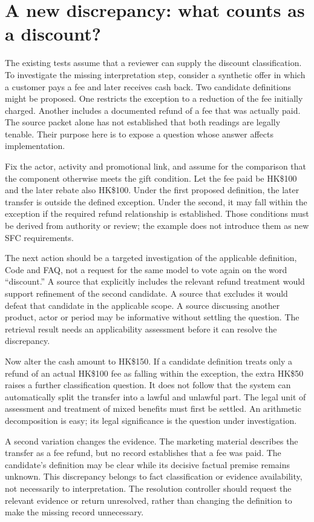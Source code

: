 \documentclass[12pt,a4paper,oneside,openany]{book}
\begin{document}
\section{A new discrepancy: what counts as a discount?}
\label{sec:circular-cashback}
The existing tests assume that a reviewer can supply the discount classification.
To investigate the missing interpretation step, consider a synthetic offer in
which a customer pays a fee and later receives cash back. Two candidate
definitions might be proposed. One restricts the exception to a reduction of
the fee initially charged. Another includes a documented refund of a fee that
was actually paid. The source packet alone has not established that both
readings are legally tenable. Their purpose here is to expose a question whose
answer affects implementation.

Fix the actor, activity and promotional link, and assume for the comparison
that the component otherwise meets the gift condition. Let the fee paid be
HK\$100 and the later rebate also HK\$100. Under the first proposed definition,
the later transfer is outside the defined exception. Under the second, it may
fall within the exception if the required refund relationship is established.
Those conditions must be derived from authority or review; the example does
not introduce them as new SFC requirements.

The next action should be a targeted investigation of the applicable definition,
Code and FAQ, not a request for the same model to vote again on the word
``discount.'' A source that explicitly includes the relevant refund treatment
would support refinement of the second candidate. A source that excludes it
would defeat that candidate in the applicable scope. A source discussing
another product, actor or period may be informative without settling the
question. The retrieval result needs an applicability assessment before it can
resolve the discrepancy.

Now alter the cash amount to HK\$150. If a candidate definition treats only a
refund of an actual HK\$100 fee as falling within the exception, the extra
HK\$50 raises a further classification question. It does not follow that the
system can automatically split the transfer into a lawful and unlawful part.
The legal unit of assessment and treatment of mixed benefits must first be
settled. An arithmetic decomposition is easy; its legal significance is the
question under investigation.

A second variation changes the evidence. The marketing material describes the
transfer as a fee refund, but no record establishes that a fee was paid. The
candidate's definition may be clear while its decisive factual premise remains
unknown. This discrepancy belongs to fact classification or evidence
availability, not necessarily to interpretation. The resolution controller
should request the relevant evidence or return unresolved, rather than
changing the definition to make the missing record unnecessary.
\end{document}
